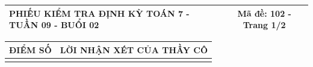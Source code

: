 \documentclass[12pt,a4paper]{article}
\begin{document}
\newpage
\noindent
\begin{tabularx}{\linewidth}{|X|c|}
\hline
\textbf{PHIẾU KIỂM TRA ĐỊNH KỲ TOÁN 7 - TUẦN 09 - BUỔI 02} & \textbf{Mã đề: 102 - Trang 1/2} \\
\hline
\end{tabularx}

\vspace{1.2mm}

\noindent
\begin{tabularx}{\linewidth}{|p{3.2cm}|X|}
\hline
\centering\textbf{ĐIỂM SỐ} & \centering\textbf{LỜI NHẬN XÉT CỦA THẦY CÔ} \tabularnewline
\hline
\rule{0pt}{1.8cm} & \tabularnewline
\hline
\end{tabularx}
\end{document}
